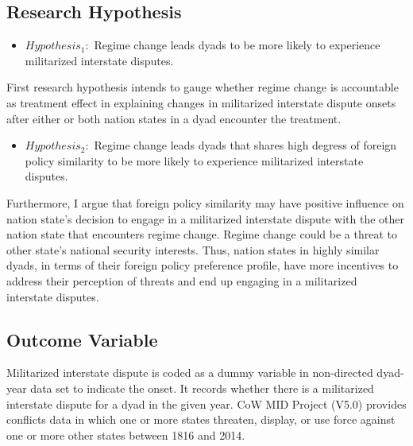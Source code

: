 \documentclass[12pt,a4paper]{article}
\begin{document}
\subsection{Research Hypothesis}
\begin{center}
\begin{itemize}
\begin{itemize}
    \item $Hypothesis_1:$ Regime change leads dyads to be more likely to experience militarized interstate disputes.
\end{itemize}
\end{itemize}
\end{center}
First research hypothesis intends to gauge whether regime change is accountable as treatment effect in explaining changes in militarized interstate dispute onsets after either or both nation states in a dyad encounter the treatment.
\begin{center}
\begin{itemize}
\begin{itemize}
    \item $Hypothesis_2:$ Regime change leads dyads that shares high degress of foreign policy similarity to be more likely to experience militarized interstate disputes.
\end{itemize}
\end{itemize}
\end{center}
Furthermore, I argue that foreign policy similarity may have positive influence on nation state's decision to engage in a militarized interstate dispute with the other nation state that encounters regime change. Regime change could be a threat to other state's national security interests. Thus, nation states in highly similar dyads, in terms of their foreign policy preference profile, have more incentives to address their perception of threats and end up engaging in a militarized interstate disputes.

\subsection{Outcome Variable}
Militarized interstate dispute is coded as a dummy variable in non-directed dyad-year data set to indicate the onset. It records whether there is a militarized interstate dispute for a dyad in the given year. CoW MID Project (V5.0) provides conflicts data in which one or more states threaten, display, or use force against one or more other states between 1816 and 2014.\parencite{palmer_2021_the} 
\end{document}
